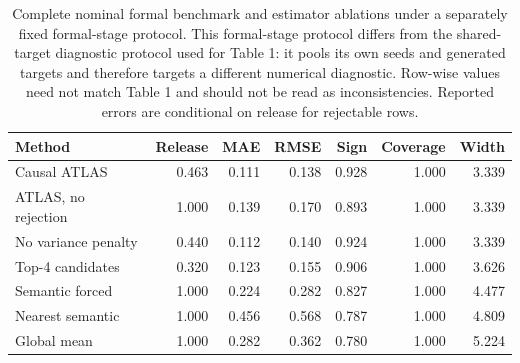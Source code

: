 \begin{table}[ht]
\centering
\caption{Complete nominal formal benchmark and estimator ablations under a separately fixed formal-stage protocol. This formal-stage protocol differs from the shared-target diagnostic protocol used for Table 1: it pools its own seeds and generated targets and therefore targets a different numerical diagnostic. Row-wise values need not match Table 1 and should not be read as inconsistencies. Reported errors are conditional on release for rejectable rows.}
\label{tab:v1-app-formal-nominal}
\begin{tabular}{lrrrrrr}
\toprule
Method & Release & MAE & RMSE & Sign & Coverage & Width \\
\midrule
Causal ATLAS & 0.463 & 0.111 & 0.138 & 0.928 & 1.000 & 3.339 \\
ATLAS, no rejection & 1.000 & 0.139 & 0.170 & 0.893 & 1.000 & 3.339 \\
No variance penalty & 0.440 & 0.112 & 0.140 & 0.924 & 1.000 & 3.339 \\
Top-4 candidates & 0.320 & 0.123 & 0.155 & 0.906 & 1.000 & 3.626 \\
Semantic forced & 1.000 & 0.224 & 0.282 & 0.827 & 1.000 & 4.477 \\
Nearest semantic & 1.000 & 0.456 & 0.568 & 0.787 & 1.000 & 4.809 \\
Global mean & 1.000 & 0.282 & 0.362 & 0.780 & 1.000 & 5.224 \\
\bottomrule
\end{tabular}
\end{table}
